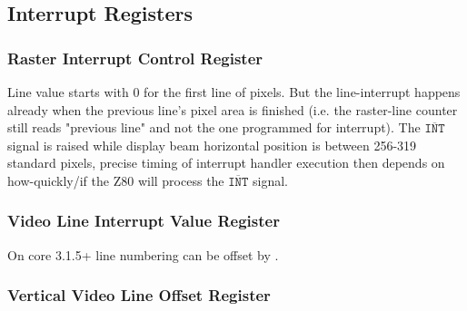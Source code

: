 \pagebreak
\subsection{Interrupt Registers}
\label{zx_next_interrupts_registers}

\subsubsection{Raster Interrupt Control Register }

\begin{NextPort}
\end{NextPort}

Line value starts with 0 for the first line of pixels. But the line-interrupt happens already when the previous line's pixel area is finished (i.e. the raster-line counter still reads "previous line" and not the one programmed for interrupt). The $\mathtt{\overline{INT}}$ signal is raised while display beam horizontal position is between 256-319 standard pixels, precise timing of interrupt handler execution then depends on how-quickly/if the Z80 will process the $\mathtt{\overline{INT}}$ signal.


\subsubsection{Video Line Interrupt Value Register }

\begin{NextPort}
\end{NextPort}

On core 3.1.5+ line numbering can be offset by .


\subsubsection{Vertical Video Line Offset Register }

